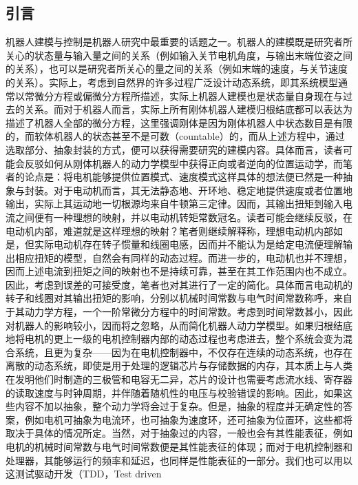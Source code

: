 \subsection{引言}
机器人建模与控制是机器人研究中最重要的话题之一。机器人的建模既是研究者所关心的状态量与输入量之间的关系（例如输入关节电机角度，与输出末端位姿之间的关系），也可以是研究者所关心的量之间的关系（例如末端的速度，与关节速度的关系）。实际上，考虑到自然界的许多过程广泛设计动态系统，即其系统模型通常以常微分方程或偏微分方程所描述，实际上机器人建模也是状态量自身现在与过去的关系。而对于机器人而言，实际上所有刚体机器人建模归根结底都可以表达为描述了机器人全部的微分方程，这里强调刚体是因为刚体机器人中状态数目是有限的，而软体机器人的状态甚至不是可数（countable）的，而从上述方程中，通过选取部分、抽象封装的方式，便可以获得需要研究的建模内容。具体而言，读者可能会反驳如何从刚体机器人的动力学模型中获得正向或者逆向的位置运动学，而笔者的论点是：将电机能够提供位置模式、速度模式这样具体的想法便已然是一种抽象与封装。对于电动机而言，其无法静态地、开环地、稳定地提供速度或者位置地输出，实际上其运动地一切根源均来自牛顿第三定律。因而，其输出扭矩到输入电流之间便有一种理想的映射，并以电动机转矩常数冠名。读者可能会继续反驳，在电动机内部，难道就是这样理想的映射？笔者则继续解释称，理想电动机内部如是，但实际电动机存在转子惯量和线圈电感，因而并不能认为是给定电流便理解输出相应扭矩的模型，自然会有同样的动态过程。而进一步的，电动机也并不理想，因而上述电流到扭矩之间的映射也不是持续可靠，甚至在其工作范围内也不成立。因此，考虑到误差的可接受度，笔者也对其进行了一定的简化。具体而言电动机的转子和线圈对其输出扭矩的影响，分别以机械时间常数与电气时间常数称呼，来自于其动力学方程，一个一阶常微分方程中的时间常数。考虑到时间常数甚小，因此对机器人的影响较小，因而将之忽略，从而简化机器人动力学模型。如果归根结底地将电机的更上一级的电机控制器内部的动态过程也考虑进去，整个系统会变为混合系统，且更为复杂——因为在电机控制器中，不仅存在连续的动态系统，也存在离散的动态系统，即使是用于处理的逻辑芯片与存储数据的内存，其本质上与人类在发明他们时制造的三极管和电容无二异，芯片的设计也需要考虑流水线、寄存器的读取速度与时钟周期，并伴随着随机性的电压与校验错误的影响。因此，如果这些内容不加以抽象，整个动力学将会过于复杂。但是，抽象的程度并无确定性的答案，例如电机可抽象为电流环，也可抽象为速度环，还可抽象为位置环，这些都将取决于具体的情况所定。当然，对于抽象过的内容，一般也会有其性能表征，例如电机的机械时间常数与电气时间常数便是其性能表征的体现；而对于电机控制器和处理器，其能够运行的频率和延迟，也同样是性能表征的一部分。我们也可以用以这测试驱动开发（TDD，Test driven 